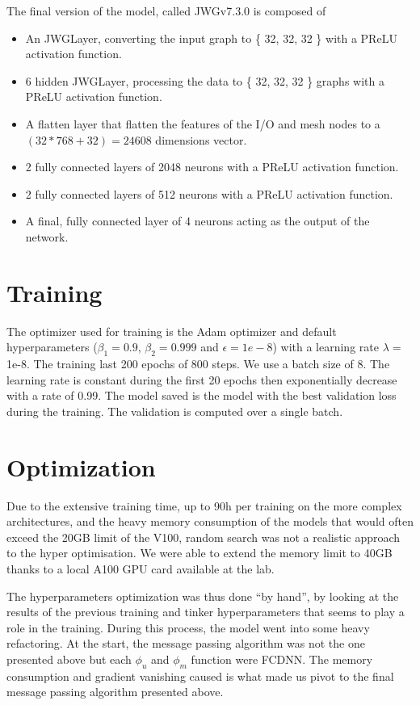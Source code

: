 \documentclass[../main.tex]{subfiles}
\begin{document}
The final version of the model, called JWGv7.3.0 is composed of
\begin{itemize}
  \item An JWGLayer, converting the input graph to \{ 32, 32, 32 \} with a PReLU activation function.
  \item 6 hidden JWGLayer, processing the data to \{ 32, 32, 32 \} graphs with a PReLU activation function.
  \item A flatten layer that flatten the features of the I/O and mesh nodes to a $(32 * 768 + 32) = 24608$ dimensions vector.
  \item 2 fully connected layers of 2048 neurons with a PReLU activation function.
  \item 2 fully connected layers of 512 neurons with a PReLU activation function.
  \item A final, fully connected layer of 4 neurons acting as the output of the network.
\end{itemize}

\section{Training}

The optimizer used for training is the Adam optimizer and default hyperparameters ($\beta_1= 0.9$, $\beta_2 = 0.999$ and $\epsilon = 1e-8$) with a learning rate $\lambda = $ 1e-8. The training last 200 epochs of 800 steps. We use a batch size of 8. The learning rate is constant during the first 20 epochs then exponentially decrease with a rate of 0.99. The model saved is the model with the best validation loss during the training. The validation is computed over a single batch.

\section{Optimization}

Due to the extensive training time, up to 90h per training on the more complex architectures, and the heavy memory consumption of the models that would often exceed the 20GB limit of the V100, random search was not a realistic approach to the hyper optimisation. We were able to extend the memory limit to 40GB thanks to a local A100 GPU card available at the lab.

The hyperparameters optimization was thus done ``by hand'', by looking at the results of the previous training and tinker hyperparameters that seems to play a role in the training. During this process, the model went into some heavy refactoring. At the start, the message passing algorithm was not the one presented above but each $\phi_u$ and $\phi_m$ function were FCDNN. The memory consumption and gradient vanishing caused is what made us pivot to the final message passing algorithm presented above.
\end{document}
